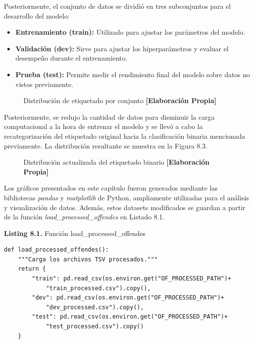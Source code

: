 Posteriormente, el conjunto de datos se dividió en tres subconjuntos para el desarrollo del modelo:

\begin{itemize}
    \item \textbf{Entrenamiento (train):} Utilizado para ajustar los parámetros del modelo.
    \item \textbf{Validación (dev):} Sirve para ajustar los hiperparámetros y evaluar el desempeño durante el entrenamiento.
    \item \textbf{Prueba (test):} Permite medir el rendimiento final del modelo sobre datos no vistos previamente.
\end{itemize}

\begin{figure}[h!]
    \centering
    \caption{Distribución de etiquetado por conjunto \textbf{[Elaboración Propia]}}
\end{figure}

Posteriormente, se redujo la cantidad de datos para disminuir la carga computacional a la hora de entrenar el modelo y se llevó a cabo la recategorización del etiquetado original hacia la clasificación binaria mencionada previamente. La distribución resultante se muestra en la Figura 8.3.

\begin{figure}[h!]
    \centering
    \caption{Distribución actualizada del etiquetado binario \textbf{[Elaboración Propia]}}
\end{figure}






\vspace{0.5cm}

Los gráficos presentados en este capítulo fueron generados mediante las bibliotecas \textit{pandas} y \textit{matplotlib} de Python, ampliamente utilizadas para el análisis y visualización de datos. Además, estos datasets modificados se guardan a partir de la función \textit{load\_processed\_offendes} en Listado 8.1.

\begin{center}
\textbf{Listing 8.1.} Función load\_processed\_offendes
\end{center}

\begin{verbatim}
def load_processed_offendes():
    """Carga los archivos TSV procesados."""
    return {
        "train": pd.read_csv(os.environ.get("OF_PROCESSED_PATH")+
            "train_processed.csv").copy(),
        "dev": pd.read_csv(os.environ.get("OF_PROCESSED_PATH")+
            "dev_processed.csv").copy(),
        "test": pd.read_csv(os.environ.get("OF_PROCESSED_PATH")+
            "test_processed.csv").copy()
    }
\end{verbatim}







